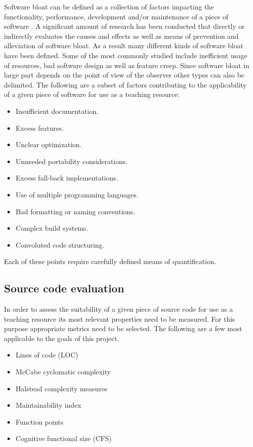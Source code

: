 Software bloat can be defined as a collection of factors impacting the functionality, performance, development and/or maintenance of a piece of software \cite{McGrenere2000AreWA,McGrenere2000BloatTO,Quach2018DebloatingST,Quach2019BloatFA}. A significant amount of research has been conducted that directly or indirectly evaluates the causes \cite{Mitchell2010FourTL} and effects \cite{Quach2019BloatFA} as well as means of prevention \cite{Pike2007ProgramDI,Milicchio2007TheUK} and alleviation \cite{Quach2018DebloatingST} of software bloat. As a result many different kinds of software bloat have been defined. Some of the most commonly studied include inefficient usage of resources, bad software design as well as feature creep. Since software bloat in large part depends on the point of view of the observer other types can also be delimited. The following are a subset of factors contributing to the applicability of a given piece of software for use as a teaching resource:

\begin{itemize}
    \item Insufficient documentation.
    \item Excess features.
    \item Unclear optimization.
    \item Unneeded portability considerations.
    \item Excess fall-back implementations.
    \item Use of multiple programming languages.
    \item Bad formatting or naming conventions.
    \item Complex build systems.
    \item Convoluted code structuring.
\end{itemize}

Each of these points require carefully defined means of quantification.

\subsection{Source code evaluation}

In order to assess the suitability of a given piece of source code for use as a teaching resource its most relevant properties need to be measured. For this purpose appropriate metrics need to be selected. The following are a few most applicable to the goals of this project.

\begin{itemize}
    \item Lines of code (LOC)
    \item McCabe cyclomatic complexity
    \item Halstead complexity measures
    \item Maintainability index
    \item Function points
    \item Cognitive functional size (CFS)
\end{itemize}

